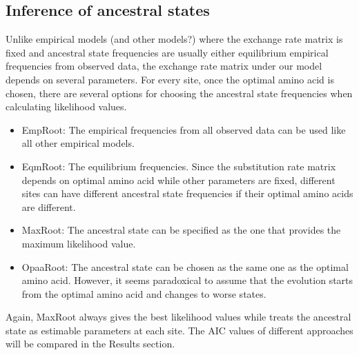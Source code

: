 \subsection{Inference of ancestral states}
Unlike empirical models (and other models?) where the exchange rate matrix is fixed and ancestral state frequencies are usually either equilibrium empirical frequencies from observed data, the exchange rate matrix under our model depends on several parameters. 
For every site, once the optimal amino acid is chosen, there are several options for choosing the ancestral state frequencies when calculating likelihood values. 
\begin{itemize}
\item EmpRoot: The empirical frequencies from all observed data can be used like all other empirical models.
\item EqmRoot: The equilibrium frequencies. Since the substitution rate matrix depends on optimal amino acid while other parameters are fixed, different sites can have different ancestral state frequencies if their optimal amino acids are different.
\item MaxRoot: The ancestral state can be specified as the one that provides the maximum likelihood value.
\item OpaaRoot: The ancestral state can be chosen as the same one as the optimal amino acid. However, it seems paradoxical to assume that the evolution starts from the optimal amino acid and changes to worse states.
\end{itemize}
Again, MaxRoot always gives the best likelihood values while treats the ancestral state as estimable parameters at each site. 
The AIC values of different approaches will be compared in the Results section.

